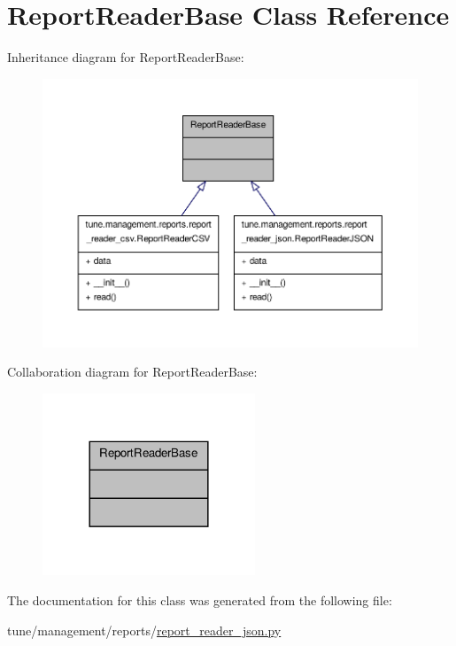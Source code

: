 \hypertarget{classReportReaderBase}{\section{Report\-Reader\-Base Class Reference}
\label{classReportReaderBase}
}


Inheritance diagram for Report\-Reader\-Base\-:
\nopagebreak
\begin{figure}[H]
\begin{center}
\leavevmode
\includegraphics[width=350pt]{classReportReaderBase__inherit__graph}
\end{center}
\end{figure}


Collaboration diagram for Report\-Reader\-Base\-:
\nopagebreak
\begin{figure}[H]
\begin{center}
\leavevmode
\includegraphics[width=180pt]{classReportReaderBase__coll__graph}
\end{center}
\end{figure}


The documentation for this class was generated from the following file\-:\begin{DoxyCompactItemize}
\item 
tune/management/reports/\hyperlink{report__reader__json_8py}{report\-\_\-reader\-\_\-json.\-py}\end{DoxyCompactItemize}
